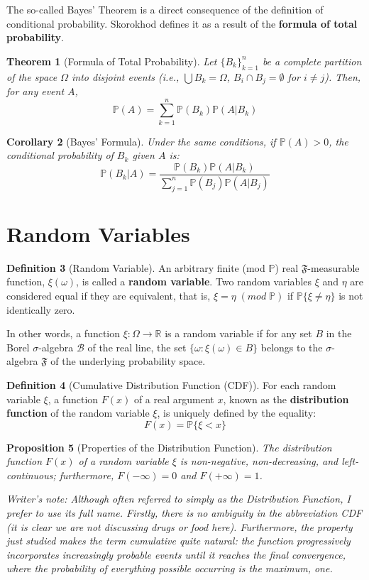 \documentclass[12pt, openany]{book}
\theoremstyle{definition}
\newtheorem{definition}{Definition}[section]
\theoremstyle{plain}
\newtheorem{theorem}[definition]{Theorem}
\newtheorem{proposition}[definition]{Proposition}
\newtheorem{corollary}[definition]{Corollary}
\theoremstyle{remark}
\newcommand{\R}{\mathbb{R}}
\newcommand{\B}{\mathcal{B}}
\newcommand{\probP}{\mathbb{P}}
\newcommand{\germF}{\mathfrak{F}} %
\begin{document}
The so-called Bayes' Theorem is a direct consequence of the definition of conditional probability. Skorokhod defines it as a result of the \textbf{formula of total probability}.

\begin{theorem}[Formula of Total Probability]
Let $\{B_k\}_{k=1}^n$ be a complete partition of the space $\Omega$ into disjoint events (i.e., $\bigcup B_k = \Omega$, $B_i \cap B_j = \emptyset$ for $i \neq j$). Then, for any event $A$,
$$ \probP(A) = \sum_{k=1}^n \probP(B_k)\probP(A|B_k) $$
\end{theorem}

\begin{corollary}[Bayes' Formula]
Under the same conditions, if $\probP(A) > 0$, the conditional probability of $B_k$ given $A$ is:
$$ \probP(B_k|A) = \frac{\probP(B_k)\probP(A|B_k)}{\sum_{j=1}^n \probP(B_j)\probP(A|B_j)} $$
\end{corollary}

\section{Random Variables}

\begin{definition}[Random Variable]
An arbitrary finite (mod $\probP$) real $\germF$-measurable function, $\xi(\omega)$, is called a \textbf{random variable}. Two random variables $\xi$ and $\eta$ are considered equal if they are equivalent, that is, $\xi = \eta \; (mod \; \probP)$ if $\probP\{\xi \neq \eta\}$ is not identically zero.

In other words, a function $\xi: \Omega \to \R$ is a random variable if for any set $B$ in the Borel $\sigma$-algebra $\B$ of the real line, the set $\{\omega: \xi(\omega) \in B\}$ belongs to the $\sigma$-algebra $\germF$ of the underlying probability space.
\end{definition}

\begin{definition}[Cumulative Distribution Function (CDF)]
For each random variable $\xi$, a function $F(x)$ of a real argument $x$, known as the \textbf{distribution function} of the random variable $\xi$, is uniquely defined by the equality:
$$ F(x) = \probP\{\xi < x\} $$
\end{definition}

\begin{proposition}[Properties of the Distribution Function]
The distribution function $F(x)$ of a random variable $\xi$ is non-negative, non-decreasing, and left-continuous; furthermore, $F(-\infty) = 0$ and $F(+\infty) = 1$.
\end{proposition}
\textit{Writer's note: Although often referred to simply as the \emph{Distribution Function}, I prefer to use its full name. Firstly, there is no ambiguity in the abbreviation \emph{CDF} (it is clear we are not discussing drugs or food here). Furthermore, the property just studied makes the term \emph{cumulative} quite natural: the function progressively incorporates increasingly probable events until it reaches the final convergence, where the probability of everything possible occurring is the maximum, one.}
\end{document}
